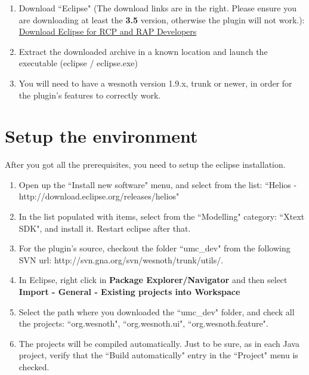 \documentclass[10pt]{article}
\begin{document}
\begin{enumerate}
\item Download ``Eclipse" (The download links are in the right. Please ensure you are downloading at least the \textbf{3.5} version, otherwise the plugin will not work.):   \href{http://eclipse.org/downloads/packages/eclipse-rcp-and-rap-developers/heliosr}{Download Eclipse for RCP and RAP Developers}

\item Extract the downloaded archive in a known location and launch the executable (eclipse / eclipse.exe)

\item You will need to have a wesnoth version 1.9.x, trunk or newer, in order for the plugin's features to correctly work.
\end{enumerate}

\section{Setup the environment}
After you got all the prerequisites, you need to setup the eclipse installation.

\begin{enumerate}
\item Open up the ``Install new software" menu, and select from the list: ``Helios - http://download.eclipse.org/releases/helios"

\item In the list populated with items, select from the ``Modelling" category: ``Xtext SDK", and install it. Restart eclipse after that.

\item For the plugin's source, checkout the folder ``umc\_dev" from the following SVN url: http://svn.gna.org/svn/wesnoth/trunk/utils/.

\item In Eclipse, right click in \textbf{Package Explorer/Navigator} and then select \textbf{Import - General - Existing projects into Workspace}

\item Select the path where you downloaded the ``umc\_dev" folder, and check all the projects: ``org.wesnoth", ``org.wesnoth.ui", ``org.wesnoth.feature".

\item The projects will be compiled automatically. Just to be sure, as in each Java project, verify that the ``Build automatically" entry in the ``Project" menu is checked.
\end{enumerate}
\end{document}
